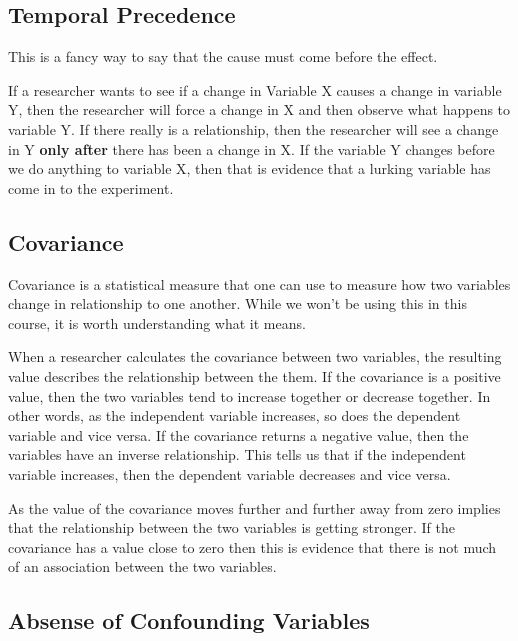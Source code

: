 \documentclass[
  letterpaper,
  DIV=11,
  numbers=noendperiod]{scrreprt}
\begin{document}
\subsection*{Temporal Precedence}\label{temporal-precedence}

This is a fancy way to say that the cause must come before the effect.

If a researcher wants to see if a change in Variable X causes a change
in variable Y, then the researcher will force a change in X and then
observe what happens to variable Y. If there really is a relationship,
then the researcher will see a change in Y \textbf{only after} there has
been a change in X. If the variable Y changes before we do anything to
variable X, then that is evidence that a lurking variable has come in to
the experiment.

\subsection*{Covariance}\label{covariance}

Covariance is a statistical measure that one can use to measure how two
variables change in relationship to one another. While we won't be using
this in this course, it is worth understanding what it means.

When a researcher calculates the covariance between two variables, the
resulting value describes the relationship between the them. If the
covariance is a positive value, then the two variables tend to increase
together or decrease together. In other words, as the independent
variable increases, so does the dependent variable and vice versa. If
the covariance returns a negative value, then the variables have an
inverse relationship. This tells us that if the independent variable
increases, then the dependent variable decreases and vice versa.

As the value of the covariance moves further and further away from zero
implies that the relationship between the two variables is getting
stronger. If the covariance has a value close to zero then this is
evidence that there is not much of an association between the two
variables.

\subsection*{Absense of Confounding
Variables}\label{absense-of-confounding-variables}
\end{document}
